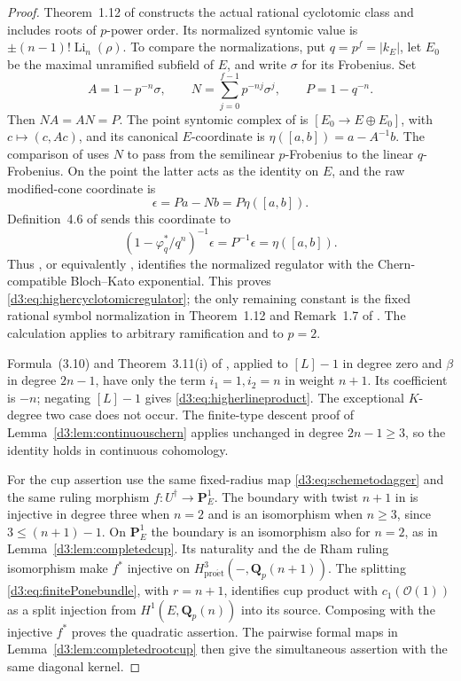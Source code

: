 \documentclass[11pt,a4paper]{amsart}
\numberwithin{equation}{section}
\theoremstyle{definition}
\theoremstyle{remark}
\newcommand{\Q}{\mathbf Q}
\newcommand{\PP}{\mathbf P}
\newcommand{\OO}{\mathcal O}
\begin{document}
\begin{proof}
Theorem~1.12 of \cite{BesserDeJeu} constructs the actual rational
cyclotomic class and includes roots of $p$-power order.
Its normalized syntomic value is
$\pm(n-1)!\operatorname{Li}_n(\rho)$.
To compare the normalizations, put $q=p^f=|k_E|$, let $E_0$ be the
maximal unramified subfield of $E$, and write $\sigma$ for its Frobenius.
Set
\[
 A=1-p^{-n}\sigma,\qquad
 N=\sum_{j=0}^{f-1}p^{-nj}\sigma^j,\qquad P=1-q^{-n}.
\]
Then $NA=AN=P$.  The point syntomic complex of
\cite[Example~2.2.4]{HuberKings} is
$[E_0\longrightarrow E\oplus E_0]$, with
$c\mapsto(c,Ac)$, and its canonical $E$-coordinate is
$\eta([a,b])=a-A^{-1}b$.
The comparison of \cite[Proposition~8.6(2)--(3), its proof and equation~(8.1)]{BesserRegulators}
uses $N$ to pass from the semilinear $p$-Frobenius to the linear
$q$-Frobenius.  On the point the latter acts as the identity on $E$,
and the raw modified-cone coordinate is
\[
 \epsilon=Pa-Nb=P\eta([a,b]).
\]
Definition~4.6 of \cite{BesserDeJeu} sends this coordinate to
\begin{equation}\label{d3:eq:pointnormalization}
 (1-\varphi_q^*/q^n)^{-1}\epsilon
   =P^{-1}\epsilon=\eta([a,b]).
\end{equation}
Thus \cite[Corollary~9.10 and Proposition~9.11]{BesserRegulators},
or equivalently \cite[Proposition~2.3.4]{HuberKings}, identifies the
normalized regulator with the Chern-compatible Bloch--Kato
exponential.  This proves \eqref{d3:eq:highercyclotomicregulator};
the only remaining constant is the fixed rational symbol normalization
in Theorem~1.12 and Remark~1.7 of \cite{BesserDeJeu}.
The calculation applies to arbitrary ramification and to $p=2$.

Formula~(3.10) and Theorem~3.11(i) of \cite{WeibelChern}, applied
to $[L]-1$ in degree zero and $\beta$ in degree $2n-1$, have only
the term $i_1=1,i_2=n$ in weight $n+1$.
Its coefficient is $-n$; negating $[L]-1$ gives
\eqref{d3:eq:higherlineproduct}. The exceptional $K$-degree two
case does not occur. The finite-type descent proof of
Lemma~\ref{d3:lem:continuouschern} applies unchanged in degree
$2n-1\geq3$, so the identity holds in continuous cohomology.

For the cup assertion use the same fixed-radius map
\eqref{d3:eq:schemetodagger} and the same ruling morphism
$f:U^\dagger\to\PP^1_E$. The boundary with twist $n+1$ in
\cite[Theorem~1.3]{ColmezNiziol} is injective in degree three
when $n=2$ and is an isomorphism when $n\geq3$, since
$3\leq(n+1)-1$. On $\PP^1_E$ the boundary is an isomorphism
also for $n=2$, as in Lemma~\ref{d3:lem:completedcup}.
Its naturality and the de Rham ruling isomorphism make
$f^*$ injective on $H^3_{\mathrm{pro\acute et}}(-,\Q_p(n+1))$.
The splitting \eqref{d3:eq:finitePonebundle}, with $r=n+1$,
identifies cup product with $c_1(\OO(1))$ as a split injection
from $H^1(E,\Q_p(n))$ into its source.
Composing with the injective $f^*$ proves the quadratic assertion.
The pairwise formal maps in Lemma~\ref{d3:lem:completedrootcup}
then give the simultaneous assertion with the same diagonal kernel.
\end{proof}
\end{document}
